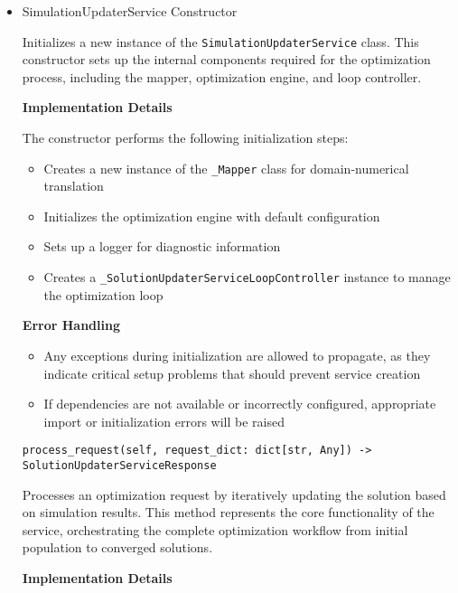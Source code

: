 \begin{itemize}
	\item SimulationUpdaterService Constructor

	Initializes a new instance of the \texttt{SimulationUpdaterService} class. This constructor sets up the internal components required for the optimization process, including the mapper, optimization engine, and loop controller.

	\textbf{Implementation Details}

	The constructor performs the following initialization steps:
	\begin{itemize}
		\item Creates a new instance of the \texttt{\_Mapper} class for domain-numerical translation
		\item Initializes the optimization engine with default configuration
		\item Sets up a logger for diagnostic information
		\item Creates a \texttt{\_SolutionUpdaterServiceLoopController} instance to manage the optimization loop
	\end{itemize}

	\textbf{Error Handling}
	\begin{itemize}
		\item Any exceptions during initialization are allowed to propagate, as they indicate critical setup problems that should prevent service creation
		\item If dependencies are not available or incorrectly configured, appropriate import or initialization errors will be raised
	\end{itemize}

\begin{verbatim}
process_request(self, request_dict: dict[str, Any]) -> SolutionUpdaterServiceResponse
\end{verbatim}

	Processes an optimization request by iteratively updating the solution based on simulation results. This method represents the core functionality of the service, orchestrating the complete optimization workflow from initial population to converged solutions.

	\textbf{Implementation Details}


\end{itemize}
